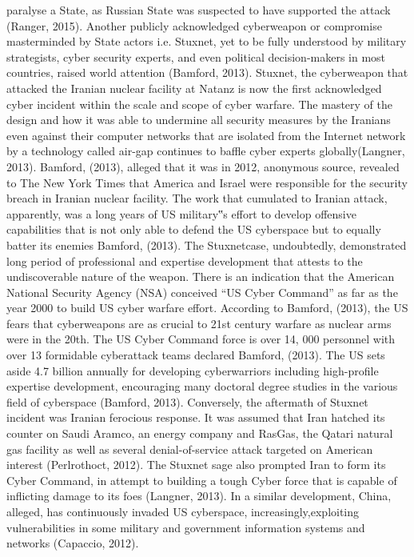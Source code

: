 \documentclass[11pt,a4paper]{article}
\begin{document}
paralyse a State, as Russian State was suspected to have supported the attack (Ranger, 2015). Another publicly acknowledged cyberweapon or compromise masterminded by State actors i.e. Stuxnet, yet to be fully understood 
by military strategists, cyber security experts, and even political decision-makers in most countries, raised world attention (Bamford, 2013). Stuxnet, the cyberweapon that attacked the Iranian nuclear facility at Natanz is now 
the first acknowledged cyber incident within the scale and scope of cyber warfare. The mastery of the design and how it was able to undermine all security measures by the Iranians even against their computer networks that are 
isolated from the Internet network by a technology called air-gap continues to baffle cyber experts globally(Langner, 2013). Bamford, (2013), alleged that it was in 2012, anonymous source, revealed to The New York 
Times that America and Israel were responsible for the security breach in Iranian nuclear facility. The work that cumulated to Iranian attack, apparently, was a long years of US military‟s effort to develop offensive capabilities 
that is not only able to defend the US cyberspace but to equally batter its enemies Bamford, (2013). The Stuxnetcase, undoubtedly, demonstrated long period of professional and expertise development that attests to the undiscoverable nature of the weapon. There is an indication that the American National Security Agency (NSA) conceived “US Cyber Command” as far as the year 2000 to build US cyber warfare effort. According to Bamford, (2013), the US fears 
that cyberweapons are as crucial to 21st century warfare as nuclear arms were in the 20th. The US Cyber Command force is over 14, 000 personnel with over 13 formidable cyberattack teams declared Bamford, (2013).
The US sets aside 4.7 billion annually for developing cyberwarriors including high-profile expertise development, encouraging many doctoral degree studies in the various field of cyberspace (Bamford, 2013).
Conversely, the aftermath of Stuxnet incident was Iranian ferocious response. It was assumed that Iran hatched its counter on Saudi Aramco, an energy company and RasGas, the Qatari natural gas facility as well as 
several denial-of-service attack targeted on American interest (Perlrothoct, 2012). The Stuxnet sage also prompted Iran to form its Cyber Command, in attempt to building a tough Cyber force that is capable of 
inflicting damage to its foes (Langner, 2013).
In a similar development, China, alleged, has continuously invaded US cyberspace, increasingly,exploiting vulnerabilities in some military and government information systems and networks (Capaccio, 2012).
\end{document}
